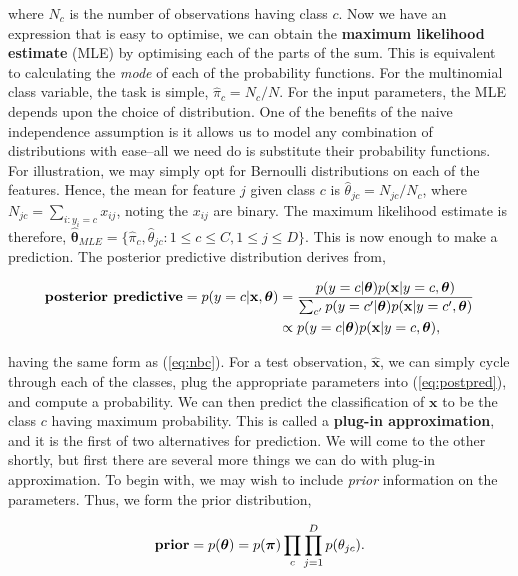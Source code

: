 \documentclass[11pt]{amsart}
\begin{document}
where $N_c$ is the number of observations having class $c$. Now we have an expression that is easy to optimise, we can obtain the \textbf{maximum likelihood estimate} (MLE) by optimising each of the parts of the sum. This is equivalent to calculating the \emph{mode} of each of the probability functions. For the multinomial class variable, the task is simple, $\hat\pi_c = N_c/N.$ For the input parameters, the MLE depends upon the choice of distribution. One of the benefits of the naive independence assumption is it allows us to model any combination of distributions with ease--all we need do is substitute their probability functions. For illustration, we may simply opt for Bernoulli distributions on each of the features. Hence, the mean for feature $j$ given class $c$ is $\hat\theta_{jc} = N_{jc}/N_c$, where $N_{jc} = \sum_{i:y_i=c} x_{ij}$, noting the $x_{ij}$ are binary. The maximum likelihood estimate is therefore, $\hat{\boldsymbol\theta}_{MLE} = \{\hat\pi_c, \hat\theta_{jc} : 1\leq c\leq C, 1\leq j\leq D\}$. This is now enough to make a prediction. The posterior predictive distribution derives from,

\begin{align}
\textbf{posterior predictive} = p(y = c|\mathbf{x},\boldsymbol\theta) 
&= \frac{p(y = c|\boldsymbol\theta)p(\mathbf{x}|y=c,\boldsymbol\theta)}{\sum_{c'}p(y = c'|\boldsymbol\theta)p(\mathbf{x}|y=c',\boldsymbol\theta)} \notag \\
&\propto p(y = c|\boldsymbol\theta)p(\mathbf{x}|y=c,\boldsymbol\theta), \label{eq:postpred}
\end{align}

having the same form as (\ref{eq:nbc}). For a test observation, $\hat{\mathbf{x}}$, we can simply cycle through each of the classes, plug the appropriate parameters into (\ref{eq:postpred}), and compute a probability. We can then predict the classification of $\mathbf{x}$ to be the class $c$ having maximum probability. This is called a \textbf{plug-in approximation}, and it is the first of two alternatives for prediction. We will come to the other shortly, but first there are several more things we can do with plug-in approximation. To begin with, we may wish to include \emph{prior} information on the parameters. Thus, we form the prior distribution,

\begin{align}
\textbf{prior} = p(\boldsymbol\theta) = p(\boldsymbol\pi)\prod_c\prod_{j=1}^Dp(\theta_{jc}). \notag
\end{align}
\end{document}
